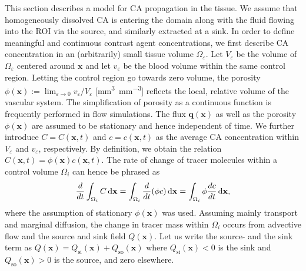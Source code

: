 \documentclass[aps,prb,article,groupedaddress,showkeys]{revtex4}
\begin{document}
	This section describes a model for  CA propagation in the tissue. %
	We assume that homogeneously dissolved CA is entering the domain along with the fluid flowing into the ROI via the source, and similarly extracted at a sink.
	In order to define meaningful and continuous contrast agent concentrations, we first describe CA concentration in an (arbitrarily) small tissue volume $\Omega_\varepsilon$.
	Let $V_\varepsilon$ be the volume of $\Omega_\varepsilon$ centered around $\mathbf{x}$ and let $v_\varepsilon$ be the blood volume within the same control region.
	Letting the control region go towards zero volume, the porosity $\phi(\mathbf{x}) :=  \lim_{\varepsilon \to 0} v_\varepsilon/V_\varepsilon$ [\si{\milli\meter\cubed\per\milli\meter\cubed}] reflects the local, relative volume of the vascular system. The simplification of porosity as a continuous function is frequently performed in flow simulations.
	The flux $\mathbf{q}(\mathbf{x})$ as well as the porosity $\phi(\mathbf{x})$ are assumed to be stationary and hence independent of time.	
	We further introduce $C = C(\mathbf{x},t)$ and $c = c(\mathbf{x},t)$ as the average CA concentration within $V_\varepsilon$ and $v_\varepsilon$, respectively.
	By definition, we obtain the relation $C(\mathbf{x},t) = \phi(\mathbf{x})  c(\mathbf{x},t)$.
	The rate of change of tracer molecules within a control volume $\Omega_i$ can hence be phrased as
	\begin{equation}
		\frac{d}{dt} \int_{\Omega_i}C  \,\mathrm{d} \mathbf{x} = \int_{\Omega_i}	\frac{d}{dt} (\phi c) \,\mathrm{d} \mathbf{x} = \int_{\Omega_i} \phi \frac{d c}{dt} \,\mathrm{d} \mathbf{x},
		\label{eq:dmdt}
	\end{equation}	
	where the assumption of stationary $\phi(\mathbf{x})$ was used.
	Assuming mainly transport and marginal diffusion, the change in tracer mass within $\Omega_i$ occurs from advective flow and the source and sink field $Q(\mathbf{x})$.
	Let us write the source- and the sink term as $Q(\mathbf{x}) = Q_{\mathrm{si}}(\mathbf{x}) + Q_{\mathrm{so}}(\mathbf{x})$ where $Q_{\mathrm{si}}(\mathbf{x}) < 0$ is the sink and $Q_{\mathrm{so}}(\mathbf{x}) > 0$ is the source, and zero elsewhere. 
\end{document}
